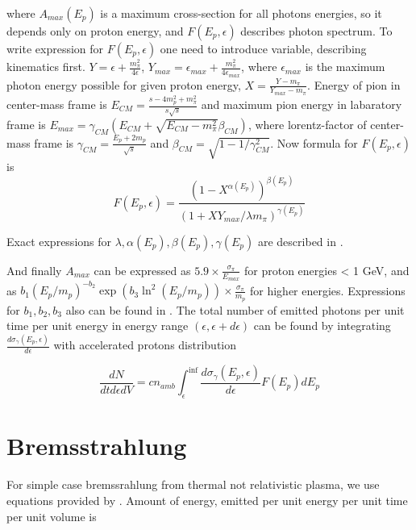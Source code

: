 where $A_{max}(E_p)$ is a maximum cross-section for all photons energies, so it depends only on proton energy, and $F\left(E_p,\epsilon\right)$ describes photon spectrum. To write expression for $F\left(E_p, \epsilon\right)$ one need to introduce variable, describing kinematics first. $Y=\epsilon+\frac{m_{\pi}^2}{4 \epsilon}$, $Y_{max}=\epsilon_{max}+\frac{m_{\pi}^2}{4 \epsilon_{max}}$, where $\epsilon_{max}$ is the maximum photon energy possible for given proton energy, $X=\frac{Y-m_{\pi}}{Y_{max}-m_{\pi}}$. Energy of pion in center-mass frame is $E_{CM}=\frac{s-4m_p^2+m_{\pi}^2}{s\sqrt{s}}$ and maximum pion energy in labaratory frame is $E_{max}=\gamma_{CM}\left(E_{CM}+\sqrt{E_{CM}-m_{\pi}^2}\beta_{CM}\right)$, where lorentz-factor of center-mass frame is $\gamma_{CM}=\frac{E_p+2m_p}{\sqrt{s}}$ and $\beta_{CM}=\sqrt{1-1/\gamma_{CM}^2}$. Now formula for $F\left(E_p,\epsilon\right)$ is
\begin{equation}
	F\left(E_p,\epsilon\right) = \frac{\left(1-X^{\alpha(E_p)}\right)^{\beta(E_p)}}{\left(1+X Y_{max}/\lambda m_{\pi}\right)^{\gamma(E_p)}}
\end{equation}

Exact expressions for $\lambda, \alpha(E_p), \beta(E_p), \gamma(E_p)$ are described in \cite{Kafexhiu}.

And finally $A_{max}$ can be expressed as $5.9\times\frac{\sigma_{\pi}}{E_{max}}$ for proton energies < 1 GeV, and as $b_1 \left(E_p/m_p\right)^{-b_2}\exp\left(b_3 \ln^2\left(E_p/m_p\right)\right)\times\frac{\sigma_{\pi}}{m_p}$ for higher energies. Expressions for $b_1, b_2, b_3$ also can be found in \cite{Kafexhiu}. The total number of emitted photons per unit time per unit energy in energy range $\left(\epsilon, \epsilon + d\epsilon\right)$ can be found by integrating $\frac{d\sigma_{\gamma}\left(E_p, \epsilon\right)}{d\epsilon}$ with accelerated protons distribution

\begin{equation}
	\frac{dN}{dt d\epsilon dV} = c n_{amb} \int_{\epsilon}^{\inf}\frac{d\sigma_{\gamma}\left(E_p, \epsilon\right)}{d\epsilon} F(E_p) dE_p
\end{equation} 

\section{Bremsstrahlung}

For simple case bremssrahlung from thermal not relativistic plasma, we use equations provided by \cite{Rybicki}. Amount of energy, emitted per unit energy per unit time per unit volume is

